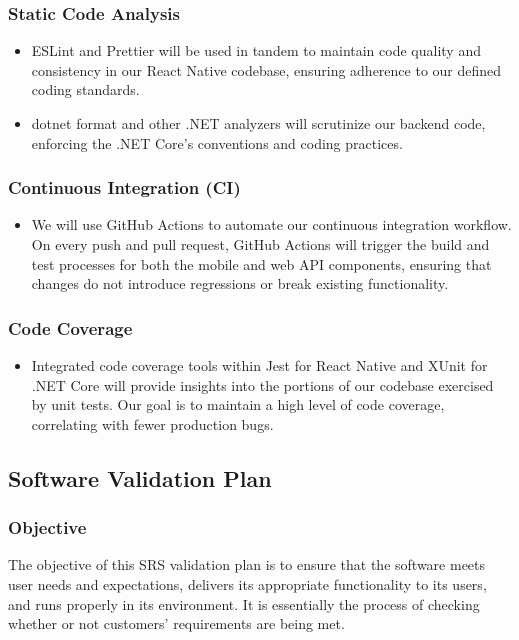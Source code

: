 \documentclass[12pt, titlepage]{article}
\begin{document}
\subsubsection{Static Code Analysis}
\begin{itemize}
  \item ESLint and Prettier will be used in tandem to maintain code quality and consistency in our React Native codebase, ensuring adherence to our defined coding standards.
  \item dotnet format and other .NET analyzers will scrutinize our backend code, enforcing the .NET Core's conventions and coding practices.
\end{itemize}

\subsubsection{Continuous Integration (CI)}
\begin{itemize}
  \item We will use GitHub Actions to automate our continuous integration workflow. On every push and pull request, GitHub Actions will trigger the build and test processes for both the mobile and web API components, ensuring that changes do not introduce regressions or break existing functionality.
\end{itemize}

\subsubsection{Code Coverage}
\begin{itemize}
  \item Integrated code coverage tools within Jest for React Native and XUnit for .NET Core will provide insights into the portions of our codebase exercised by unit tests. Our goal is to maintain a high level of code coverage, correlating with fewer production bugs.
\end{itemize}

\subsection{Software Validation Plan}

\subsubsection{Objective}
The objective of this SRS validation plan is to ensure that the software meets user needs and expectations, delivers its appropriate functionality to its users, and runs properly in its environment. It is essentially the process of checking whether or not customers' requirements are being met.
\end{document}
